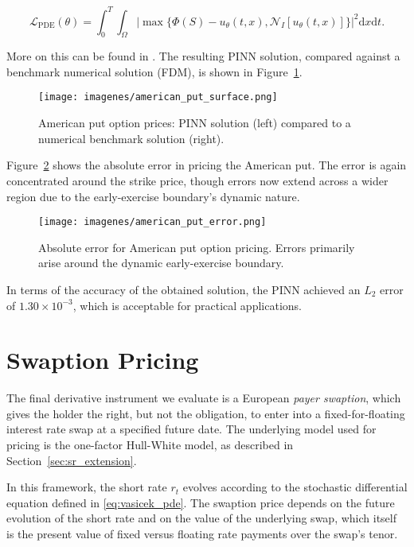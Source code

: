 \documentclass[12pt]{report} %
\theoremstyle{plain}           %
\theoremstyle{definition}      %
\theoremstyle{remark}          %
\begin{document}
$$
\mathcal{L}_{\text{PDE}}(\theta) = \int_{0}^{T}\int_{\Omega}\left|\max\{\Phi(S)- u_\theta(t,x), \mathcal{N}_I[u_\theta(t,x)]\}\right|^2\mathrm{d}x\mathrm{d}t.
$$

More on this can be found in \cite{wilmott1995mathematics, IKONEN2004809}. The resulting PINN solution, compared against a benchmark 
numerical solution (FDM), is shown in Figure~\ref{fig:american_put_option}.

\begin{figure}[H]
	\centering
	\texttt{[image: imagenes/american\_put\_surface.png]}
	\caption{American put option prices: PINN solution (left) compared to a numerical 
	benchmark solution (right).}
	\label{fig:american_put_option}
\end{figure}

Figure~\ref{fig:american_put_option_error} shows the absolute error in pricing the 
American put. The error is again concentrated around the strike price, though errors 
now extend across a wider region due to the early-exercise boundary's dynamic nature.

\begin{figure}[H]
	\centering
	\texttt{[image: imagenes/american\_put\_error.png]}
	\caption{Absolute error for American put option pricing. Errors primarily arise
	 around the dynamic early-exercise boundary.}
	\label{fig:american_put_option_error}
\end{figure}

In terms of the accuracy of the obtained solution, the PINN achieved an \(L_2\) error of 
\(1.30\times10^{-3}\), which is acceptable for practical applications. 

\section{Swaption Pricing}

The final derivative instrument we evaluate is a European \emph{payer swaption}, which 
gives the holder the right, but not the obligation, to enter into a fixed-for-floating 
interest rate swap at a specified future date. The underlying model used for pricing is 
the one-factor Hull-White model, as described in Section~\ref{sec:sr_extension}.

In this framework, the short rate \( r_t \) evolves according to the stochastic differential equation defined in 
\ref{eq:vasicek_pde}. The swaption price depends on the future evolution of the short rate and on 
the value of the underlying swap, which itself is the present value of fixed versus floating rate 
payments over the swap's tenor.
\end{document}
